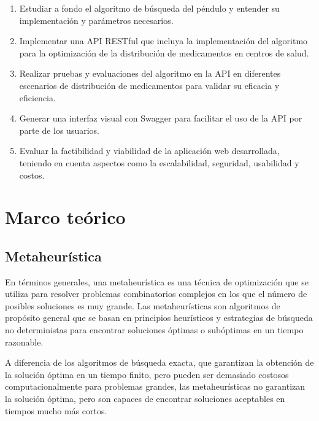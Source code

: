 \documentclass[conference]{IEEEtran}
\begin{document}
\begin{enumerate}
    \item Estudiar a fondo el algoritmo de búsqueda del péndulo y entender su
          implementación y parámetros necesarios.
    \item Implementar una API RESTful que incluya la implementación del
          algoritmo para la optimización de la distribución de medicamentos en
          centros de
          salud.
    \item Realizar pruebas y evaluaciones del algoritmo en la API en diferentes
          escenarios de distribución de medicamentos para validar su eficacia y
          eficiencia.
    \item Generar una interfaz visual con Swagger para facilitar el uso de la
          API por parte de los usuarios.
    \item Evaluar la factibilidad y viabilidad de la aplicación web
          desarrollada, teniendo en cuenta aspectos como la escalabilidad,
          seguridad,
          usabilidad y costos.
\end{enumerate}

\section{Marco teórico}
\label{sec:MT}

\subsection{Metaheurística}
En términos generales, una metaheurística es una técnica de optimización que se
utiliza para resolver problemas combinatorios complejos en los que el número de
posibles soluciones es muy grande. Las metaheurísticas son algoritmos de
propósito general que se basan en principios heurísticos y estrategias de
búsqueda no deterministas para encontrar soluciones óptimas o subóptimas en un
tiempo razonable.

A diferencia de los algoritmos de búsqueda exacta, que garantizan la obtención
de la solución óptima en un tiempo finito, pero pueden ser demasiado costosos
computacionalmente para problemas grandes, las metaheurísticas no garantizan la
solución óptima, pero son capaces de encontrar soluciones aceptables en tiempos
mucho más cortos.
\end{document}
